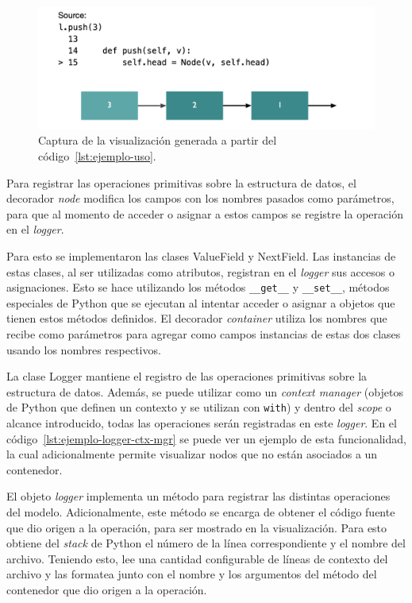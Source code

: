\begin{figure}[h!]
    \centering
    \includegraphics[width=\linewidth]{imagenes/ejemplos/ejemplo}
    \caption{Captura de la visualización generada a partir del código~\ref{lst:ejemplo-uso}.}
    \label{fig:visualizacion_ej}
    \centering
\end{figure}

Para registrar las operaciones primitivas sobre la estructura de datos, el decorador \textit{node} modifica los campos con los nombres pasados como parámetros, para que al momento de acceder o asignar a estos campos se registre la operación en el \textit{logger}.

Para esto se implementaron las clases ValueField y NextField. Las instancias de estas clases, al ser utilizadas como atributos, registran en el \textit{logger} sus accesos o asignaciones. Esto se hace utilizando los métodos \texttt{\_\_get\_\_} y \texttt{\_\_set\_\_}, métodos especiales de Python que se ejecutan al intentar acceder o asignar a objetos que tienen estos métodos definidos. El decorador \textit{container} utiliza los nombres que recibe como parámetros para agregar como campos instancias de estas dos clases usando los nombres respectivos.

La clase Logger mantiene el registro de las operaciones primitivas sobre la estructura de datos. Además, se puede utilizar como un \textit{context manager} (objetos de Python que definen un contexto y se utilizan con \texttt{with}) y dentro del \textit{scope} o alcance introducido, todas las operaciones serán registradas en este \textit{logger}. En el código~\ref{lst:ejemplo-logger-ctx-mgr} se puede ver un ejemplo de esta funcionalidad, la cual adicionalmente permite visualizar nodos que no están asociados a un contenedor.

El objeto \textit{logger} implementa un método para registrar las distintas operaciones del modelo. Adicionalmente, este método se encarga de obtener el código fuente que dio origen a la operación, para ser mostrado en la visualización. Para esto obtiene del \textit{stack} de Python el número de la línea correspondiente y el nombre del archivo. Teniendo esto, lee una cantidad configurable de líneas de contexto del archivo y las formatea junto con el nombre y los argumentos del método del contenedor que dio origen a la operación.

